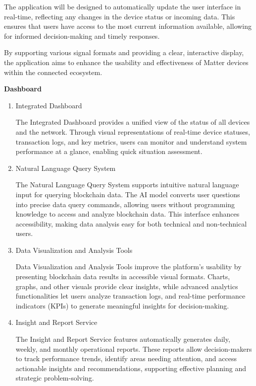 \documentclass[conference]{IEEEtran}
\begin{document}
\begin{enumerate}[itemsep=2ex, parsep=1ex]
	      The application will be designed to automatically update the user
	      interface in real-time, reflecting any changes in the device status or incoming
	      data. This ensures that users have access to the most current information
	      available, allowing for informed decision-making and timely responses.
	      	      
	      By supporting various signal formats and providing a clear, interactive
	      display, the application aims to enhance the usability and effectiveness of
	      Matter devices within the connected ecosystem.
\end{enumerate}

{\centering \textbf{Dashboard} \par}
\begin{enumerate}[itemsep=2ex, parsep=1ex]
	\item Integrated Dashboard
	      	      
	      The Integrated Dashboard provides a unified view of the status of all
	      devices and the network. Through visual representations of real-time device
	      statuses, transaction logs, and key metrics, users can monitor and
	      understand system performance at a glance, enabling quick situation assessment.
	      	      
	\item Natural Language Query System
	      	      
	      The Natural Language Query System supports intuitive natural language
	      input for querying blockchain data. The AI model converts user questions into
	      precise data query commands, allowing users without programming knowledge
	      to access and analyze blockchain data. This interface enhances accessibility,
	      making data analysis easy for both technical and non-technical users.
	      	      
	\item Data Visualization and Analysis Tools
	      	      
	      Data Visualization and Analysis Tools improve the platform’s usability by
	      presenting blockchain data results in accessible visual formats. Charts,
	      graphs, and other visuals provide clear insights, while advanced analytics
	      functionalities let users analyze transaction logs, and real-time performance
	      indicators (KPIs) to generate meaningful insights for decision-making.
	      	      
	\item Insight and Report Service
	      	      
	      The Insight and Report Service features automatically generates daily, weekly,
	      and monthly operational reports. These reports allow decision-makers to track
	      performance trends, identify areas needing attention, and access actionable
	      insights and recommendations, supporting effective planning and strategic
	      problem-solving.
\end{enumerate}
\end{document}
